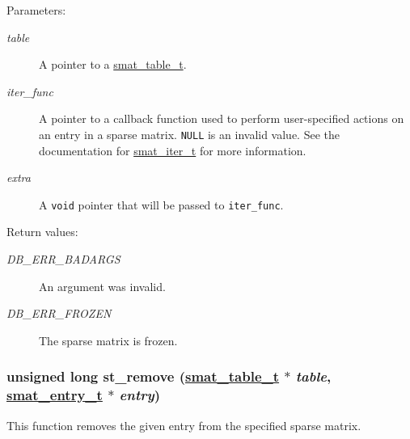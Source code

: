 \begin{Desc}
\item[Parameters:]
\begin{description}
\item[{\em table}]A pointer to a \hyperlink{group__dbprim__smat_a0}{smat\_\-table\_\-t}. \item[{\em iter\_\-func}]A pointer to a callback function used to perform user-specified actions on an entry in a sparse matrix. {\tt NULL} is an invalid value. See the documentation for \hyperlink{group__dbprim__smat_a4}{smat\_\-iter\_\-t} for more information. \item[{\em extra}]A {\tt void} pointer that will be passed to {\tt iter\_\-func}.\end{description}
\end{Desc}
\begin{Desc}
\item[Return values:]
\begin{description}
\item[{\em DB\_\-ERR\_\-BADARGS}]An argument was invalid. \item[{\em DB\_\-ERR\_\-FROZEN}]The sparse matrix is frozen. \end{description}
\end{Desc}
\hypertarget{group__dbprim__smat_a11}{
\subsubsection[st\_\-remove]{\setlength{\rightskip}{0pt plus 5cm}unsigned long st\_\-remove (\hyperlink{dbprim_8h_a0}{smat\_\-table\_\-t} $\ast$ {\em table}, \hyperlink{dbprim_8h_a2}{smat\_\-entry\_\-t} $\ast$ {\em entry})}}
\label{group__dbprim__smat_a11}


This function removes the given entry from the specified sparse matrix.

